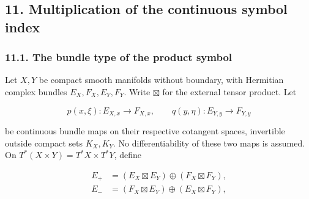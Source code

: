 \documentclass[
  11pt,
]{article}
\makeatletter
\let\ReaderOriginalAnchorStart\hyper@anchorstart
\let\ReaderOriginalAnchorEnd\hyper@anchorend
\let\ReaderPendingAliases\@empty
\def\ReaderArmAliases#1{\gdef\ReaderPendingAliases{#1}}
\def\hyper@anchorstart#1{\ReaderIfNativeAnchorTF{#1}{\ReaderPendingAliases\global\let\ReaderPendingAliases\@empty}{}\ReaderOriginalAnchorStart{#1}}
\makeatother
\begin{document}
\ReaderArmAliases{\ReaderOriginalAnchorStart{AN03-GSI-011}\ReaderOriginalAnchorEnd\begingroup\expandafter\def\csname @currentHref\endcsname{AN03-GSI-011}\label{AN03-GSI-011}\endgroup\ReaderOriginalAnchorStart{an03-gsi-011-multiplication-of-the-continuous-symbol-index}\ReaderOriginalAnchorEnd\begingroup\expandafter\def\csname @currentHref\endcsname{an03-gsi-011-multiplication-of-the-continuous-symbol-index}\label{an03-gsi-011-multiplication-of-the-continuous-symbol-index}\endgroup\ReaderOriginalAnchorStart{11-multiplication-of-the-continuous-symbol-index}\ReaderOriginalAnchorEnd\begingroup\expandafter\def\csname @currentHref\endcsname{11-multiplication-of-the-continuous-symbol-index}\label{11-multiplication-of-the-continuous-symbol-index}\endgroup}
\subsection{11. Multiplication of the continuous symbol
index}\label{multiplication-of-the-continuous-symbol-index}

\ReaderArmAliases{\ReaderOriginalAnchorStart{pp-c-a-product-symbol-has-a-fixed-bundle-type}\ReaderOriginalAnchorEnd\begingroup\expandafter\def\csname @currentHref\endcsname{pp-c-a-product-symbol-has-a-fixed-bundle-type}\label{pp-c-a-product-symbol-has-a-fixed-bundle-type}\endgroup\ReaderOriginalAnchorStart{11-1-the-bundle-type-of-the-product-symbol}\ReaderOriginalAnchorEnd\begingroup\expandafter\def\csname @currentHref\endcsname{11-1-the-bundle-type-of-the-product-symbol}\label{11-1-the-bundle-type-of-the-product-symbol}\endgroup}
\subsubsection{11.1. The bundle type of the product
symbol}\label{the-bundle-type-of-the-product-symbol}

Let \(X,Y\) be compact smooth manifolds without boundary, with Hermitian
complex bundles \(E_X,F_X,E_Y,F_Y\). Write \(\boxtimes\) for the
external tensor product. Let

\[
 p(x,\xi):E_{X,x}\longrightarrow F_{X,x},\qquad
 q(y,\eta):E_{Y,y}\longrightarrow F_{Y,y}
\]

be continuous bundle maps on their respective cotangent spaces,
invertible outside compact sets \(K_X,K_Y\). No differentiability of
these two maps is assumed. On \(T^*(X\times Y)=T^*X\times T^*Y\), define

\[
 \begin{aligned}
 E_+&=(E_X\boxtimes E_Y)\oplus(F_X\boxtimes F_Y),\\
 E_-&=(F_X\boxtimes E_Y)\oplus(E_X\boxtimes F_Y),
 \end{aligned}
\]
\end{document}
